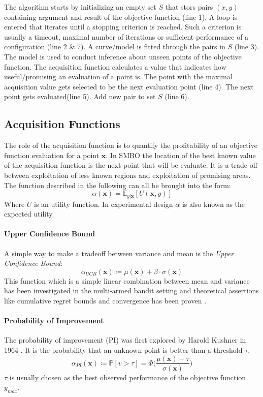 \documentclass[english]{article}
\newcommand{\x}{\mathbf{x}}
\newcommand{\E}{\mathbb{E}}
\begin{document}
The algorithm starts by initializing an empty set $S$ that stors pairs $(x,y)$ containing argument and result of the objective function (line 1). A loop is entered that iterates until a stopping criterion is reached. Such a criterion is usually a timeout, maximal number of iterations or sufficient performance of a configuration (line 2 \& 7). A curve/model is fitted through the pairs in $S$ (line 3). The model is used to conduct inference about unseen points of the objective function. The acquisition function calculates a value that indicates how useful/promising an evaluation of a point is. The point with the maximal acquisition value gets selected to be the next evaluation point (line 4). The next point gets evaluated(line 5). Add new pair to set $S$ (line 6).

\subsection{Acquisition Functions}
\label{aquifuncs}
The role of the acquisition function is to quantify the profitability of an objective function evaluation for a point $\x$. In SMBO the location of the best known value of the acquisition function is the next point that will be evaluate. It is a trade off between exploitation of less known regions and exploitation of promising areas. The function described in the following can all be brought into the form:
\begin{equation}
  \alpha(\x) = \E_{y|\x}[U(\x,y)]
\end{equation}
Where $U$ is an utility function. In experimental design $\alpha$ is also known as the expected utility.

\paragraph{Upper Confidence Bound}
A simple way to make a tradeoff between variance and mean is the \textit{Upper Confidence Bound}:
\begin{equation}
  \alpha_{UCB}(\x) \coloneqq \mu(\x) + \beta \cdot \sigma(\x)
\end{equation}
This function which is a simple linear combination between mean and variance has been investigated in the multi-armed bandit setting and theoretical assertions like cumulative regret bounds and convergence has been proven \cite{srinivas_gaussian_2009}.

\paragraph{Probability of Improvement}
The probability of improvement (PI) was first explored by Harold Kushner in 1964 \cite{kushner_new_1964}. It is the probability that an unknown point is better than a threshold $\tau$.
\begin{equation}
  \alpha_{PI}(\x) \coloneqq \mathbb{P}[v>\tau] = \Phi\bigg(\frac{\mu(\x)-\tau}{\sigma(\x)}\bigg)
\end{equation}
$\tau$ is usually chosen as the best observed performance of the objective function $y_{max}$.
\end{document}
